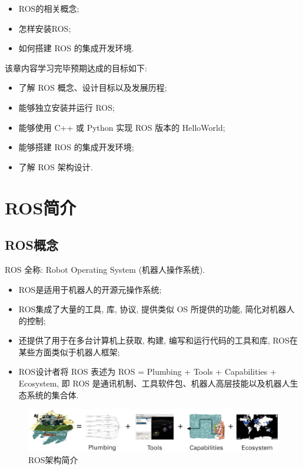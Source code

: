 \documentclass[openany, fontset=windowsold]{ctexbook}
\theoremstyle{kaiti}
\theoremstyle{normal}
\begin{document}
\begin{itemize}
  \item ROS的相关概念;
  \item 怎样安装ROS;
  \item 如何搭建 ROS 的集成开发环境.
\end{itemize}

该章内容学习完毕预期达成的目标如下:

\begin{itemize}
  \item 了解 ROS 概念、设计目标以及发展历程;
  \item 能够独立安装并运行 ROS;
  \item 能够使用 C++ 或 Python 实现 ROS 版本的 HelloWorld;
  \item 能够搭建 ROS 的集成开发环境;
  \item 了解 ROS 架构设计.
\end{itemize}

\section{ROS简介}

\subsection{ROS概念}

ROS 全称: Robot Operating System (机器人操作系统).

\begin{itemize}
  \item ROS是适用于机器人的开源元操作系统;
  \item ROS集成了大量的工具, 库, 协议, 提供类似 OS 所提供的功能, 简化对机器人的控制;
  \item 还提供了用于在多台计算机上获取, 构建, 编写和运行代码的工具和库, ROS在某些方面类似于机器人框架;
  \item ROS设计者将 ROS 表述为 ROS = Plumbing + Tools + Capabilities + Ecosystem, 即 ROS 是通讯机制、工具软件包、机器人高层技能以及机器人生态系统的集合体.
\end{itemize}

\begin{figure}[!ht]
  \centering
  \includegraphics[width=.9\textwidth]{ros_intro.png}
  \caption{ROS架构简介}
  \label{fig:ros_intro}
\end{figure}
\end{document}
